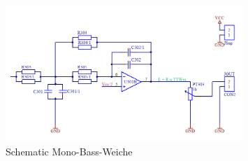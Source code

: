 \begin{figure} [H]
	\centering
	\includegraphics[width=0.8\textwidth]{img/Print3/3mTTWeicheruAddiererDiplSchematicTeil2.png}
	\caption{Schematic Mono-Bass-Weiche}
	\label {fig:5.1.3.3}
\end{figure}

